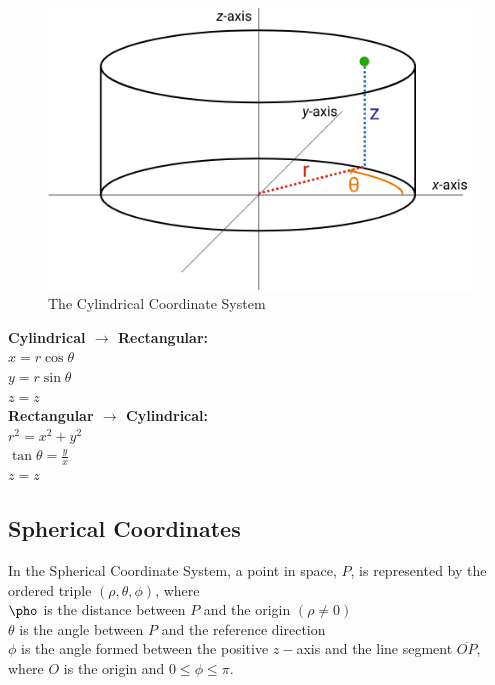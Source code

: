         \begin{figure} [hbt!]
            \centering
            \includegraphics[scale=0.5]{Resources/Unit3Vectors/cylindrical.png}
            \caption*{The Cylindrical Coordinate System}
        \end{figure}

        \noindent \textbf{Cylindrical $\rightarrow$ Rectangular:} \\
        $   x=r\cos\theta$ \\
        $   y=r\sin\theta$ \\
        $   z=z$ \\
        \textbf{Rectangular $\rightarrow$ Cylindrical:} \\
        $   r^2=x^2+y^2$ \\
        $   \tan\theta=\frac{y}{x}$ \\
        $   z=z$ \\



    \pagebreak
    \subsection{Spherical Coordinates}

        In the Spherical Coordinate System, a point in space, $P$, is represented by the ordered
        triple $(\rho, \theta, \phi)$, where \\
        $   \pho $ is the distance between $P$ and the origin $(\rho\not=0)$ \\
        $   \theta $ is the angle between $P$ and the reference direction \\
        $   \phi $ is the angle formed between the positive $z-$axis and the line segment
        $\overline{OP}$, where $O$ is the origin and $0\leq\phi\leq\pi$.

